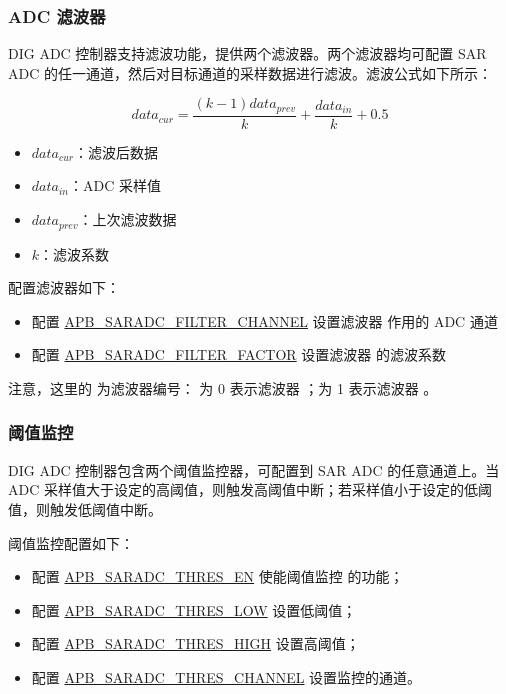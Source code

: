 \documentclass[main\_\_CN.tex]{subfiles}
\begin{document}
\subsubsection{ADC 滤波器}
DIG ADC 控制器支持滤波功能，提供两个滤波器。两个滤波器均可配置 SAR ADC 的任一通道，然后对目标通道的采样数据进行滤波。滤波公式如下所示：

\[data_{cur} = \frac{(k-1)data_{prev}}{k}+\frac{data_{in}}{k}+0.5\]

\begin{itemize}
    \item \(data_{cur}\)：滤波后数据
    \item \(data_{in}\)：ADC 采样值
    \item \(data_{prev}\)：上次滤波数据
    \item \(k\)：滤波系数
\end{itemize}

配置滤波器如下：
\begin{itemize}
\item 配置 \hyperref[fielddesc:APBSARADCAPBSARADCFILTERCHANNEL1]{APB\_SARADC\_FILTER\_CHANNEL} 设置滤波器  作用的 ADC 通道
\item 配置 \hyperref[fielddesc:APBSARADCAPBSARADCFILTERCHANNEL1]{APB\_SARADC\_FILTER\_FACTOR} 设置滤波器  的滤波系数
\end{itemize}

注意，这里的  为滤波器编号： 为 0 表示滤波器 ；为 1 表示滤波器 。

\subsubsection{阈值监控}
DIG ADC 控制器包含两个阈值监控器，可配置到 SAR ADC 的任意通道上。当 ADC 采样值大于设定的高阈值，则触发高阈值中断；若采样值小于设定的低阈值，则触发低阈值中断。

阈值监控配置如下：
\begin{itemize}
    \item 配置 \hyperref[fielddesc:APBSARADCAPBSARADCTHRES1EN]{APB\_SARADC\_THRES\_EN} 使能阈值监控  的功能；
    \item 配置 \hyperref[fielddesc:APBSARADCAPBSARADCTHRES1LOW]{APB\_SARADC\_THRES\_LOW} 设置低阈值；
    \item 配置 \hyperref[fielddesc:APBSARADCAPBSARADCTHRES1LOW]{APB\_SARADC\_THRES\_HIGH} 设置高阈值；
    \item 配置 \hyperref[fielddesc:APBSARADCAPBSARADCTHRES1LOW]{APB\_SARADC\_THRES\_CHANNEL} 设置监控的通道。
\end{itemize}
\end{document}
